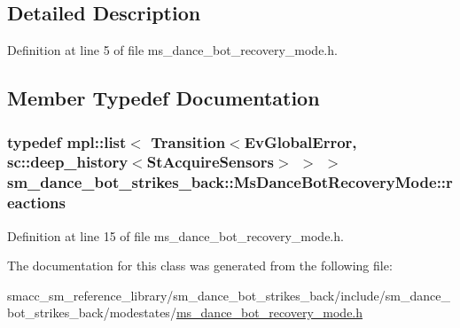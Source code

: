 \subsection{Detailed Description}


Definition at line 5 of file ms\+\_\+dance\+\_\+bot\+\_\+recovery\+\_\+mode.\+h.



\subsection{Member Typedef Documentation}
\subsubsection[{\texorpdfstring{reactions}{reactions}}]{\setlength{\rightskip}{0pt plus 5cm}typedef mpl\+::list$<$ Transition$<${\bf Ev\+Global\+Error}, sc\+::deep\+\_\+history$<${\bf St\+Acquire\+Sensors}$>$ $>$ $>$ {\bf sm\+\_\+dance\+\_\+bot\+\_\+strikes\+\_\+back\+::\+Ms\+Dance\+Bot\+Recovery\+Mode\+::reactions}}\hypertarget{classsm__dance__bot__strikes__back_1_1MsDanceBotRecoveryMode_a4eb40cad98fb332413ed8c515b9c0cf2}{}\label{classsm__dance__bot__strikes__back_1_1MsDanceBotRecoveryMode_a4eb40cad98fb332413ed8c515b9c0cf2}


Definition at line 15 of file ms\+\_\+dance\+\_\+bot\+\_\+recovery\+\_\+mode.\+h.



The documentation for this class was generated from the following file\+:\begin{DoxyCompactItemize}
\item 
smacc\+\_\+sm\+\_\+reference\+\_\+library/sm\+\_\+dance\+\_\+bot\+\_\+strikes\+\_\+back/include/sm\+\_\+dance\+\_\+bot\+\_\+strikes\+\_\+back/modestates/\hyperlink{strikes__back_2include_2sm__dance__bot__strikes__back_2modestates_2ms__dance__bot__recovery__mode_8h}{ms\+\_\+dance\+\_\+bot\+\_\+recovery\+\_\+mode.\+h}\end{DoxyCompactItemize}
